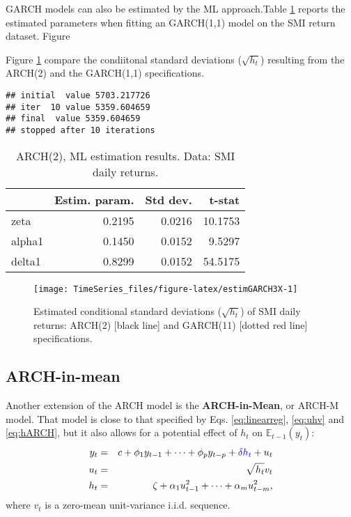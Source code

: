 \documentclass[
  12pt,
]{book}
\theoremstyle{definition}
\theoremstyle{definition}
\theoremstyle{definition}
\theoremstyle{definition}
\theoremstyle{remark}
\begin{document}
GARCH models can also be estimated by the ML approach.Table \ref{tab:estimGARCH2X} reports the estimated parameters when fitting an GARCH(1,1) model on the SMI return dataset. Figure

Figure \ref{fig:estimGARCH3X} compare the condiitonal standard deviations (\(\sqrt{h_t}\)) resulting from the ARCH(2) and the GARCH(1,1) specifications.

\begin{verbatim}
## initial  value 5703.217726 
## iter  10 value 5359.604659
## final  value 5359.604659 
## stopped after 10 iterations
\end{verbatim}

\begin{table}

\caption{\label{tab:estimGARCH2X}ARCH(2), ML estimation results.
             Data: SMI daily returns.}
\centering
\begin{tabular}[t]{l|r|r|r}
\hline
  & Estim. param. & Std dev. & t-stat\\
\hline
zeta & 0.2195 & 0.0216 & 10.1753\\
\hline
alpha1 & 0.1450 & 0.0152 & 9.5297\\
\hline
delta1 & 0.8299 & 0.0152 & 54.5175\\
\hline
\end{tabular}
\end{table}

\begin{figure}
\texttt{[image: TimeSeries\_files/figure-latex/estimGARCH3X-1]} \caption{Estimated conditional standard deviations ($\sqrt{h_t}$) of SMI daily returns: ARCH(2) [black line] and GARCH(11) [dotted red line] specifications.}\label{fig:estimGARCH3X}
\end{figure}

\hypertarget{arch-in-mean}{%
\subsection{ARCH-in-mean}\label{arch-in-mean}}

Another extension of the ARCH model is the \textbf{ARCH-in-Mean}, or ARCH-M model. That model is close to that specified by Eqs. \eqref{eq:linearreg}, \eqref{eq:uhv} and \eqref{eq:hARCH}, but it also allows for a potential effect of \(h_t\) on \(\mathbb{E}_{t-1}(y_{t})\):
\begin{eqnarray*}
y_t &=& c + \phi_1 y_{t-1} + \dots + \phi_p y_{t-p} + {\color{blue}\delta h_t}+ u_t \\
u_t &=& \sqrt{h_t} v_t \\
h_t &=& \zeta + \alpha_1 u_{t-1}^2 + \dots + \alpha_m u_{t-m}^2,
\end{eqnarray*}
where \(v_t\) is a zero-mean unit-variance i.i.d. sequence.
\end{document}
